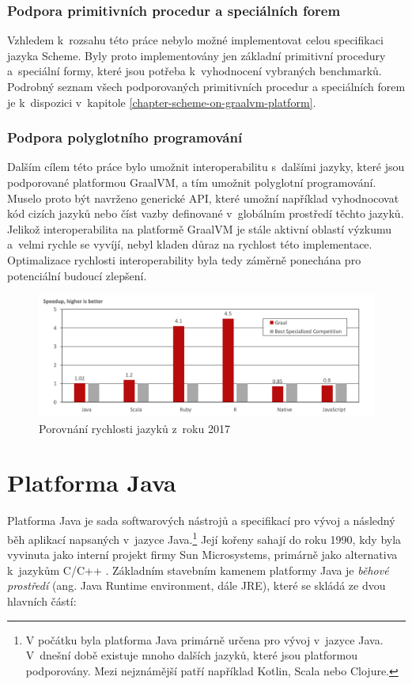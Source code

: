 \documentclass[
  master,
  biblatex,
  figures=true,
  theorems,
  sourcecodes,
  glossaries,
  index
]{kidiplom}
\begin{document}
\subsubsection{Podpora primitivních procedur a speciálních forem}
Vzhledem k~rozsahu této práce nebylo možné implementovat celou specifikaci jazyka Scheme. Byly proto implementovány jen základní primitivní procedury a~speciální formy, které jsou potřeba k~vyhodnocení vybraných benchmarků. Podrobný seznam všech podporovaných primitivních procedur a speciálních forem je k~dispozici v~kapitole \ref{chapter-scheme-on-graalvm-platform}.


\subsubsection{Podpora polyglotního programování}
Dalším cílem této práce bylo umožnit interoperabilitu s~dalšími jazyky, které jsou podporované platformou GraalVM, a tím umožnit polyglotní programování. Muselo proto být navrženo generické API, které umožní například vyhodnocovat kód cizích jazyků nebo číst vazby definované v~globálním prostředí těchto jazyků. Jelikož interoperabilita na platformě GraalVM je stále aktivní oblastí výzkumu a~velmi rychle se vyvíjí, nebyl kladen důraz na rychlost této implementace. Optimalizace rychlosti interoperability byla tedy záměrně ponechána pro potenciální budoucí zlepšení. 



\begin{figure} [h]
    \centering
    \includegraphics[width= 1\textwidth]{images/graalvm-performace-graph.png}
    \caption{Porovnání rychlosti jazyků z~roku 2017 \cite{performace-graph}}
    \label{fig:performance-graph}
\end{figure}


\clearpage

\section{Platforma Java}
Platforma Java je sada softwarových nástrojů a specifikací pro vývoj a následný běh aplikací napsaných v~jazyce Java.\footnote{V počátku byla platforma Java  primárně určena pro vývoj v~jazyce Java. V~dnešní době existuje mnoho dalších jazyků, které jsou platformou podporovány. Mezi nejznámější patří například Kotlin, Scala nebo Clojure.} Její kořeny sahají do roku 1990, kdy byla vyvinuta jako interní projekt firmy Sun Microsystems, primárně jako alternativa k~jazykům C/C++ \cite{java-platform}. Základním stavebním kamenem platformy Java je \textit{běhové prostředí} (ang. Java Runtime environment, dále JRE), které se skládá ze dvou hlavních částí:
\end{document}
